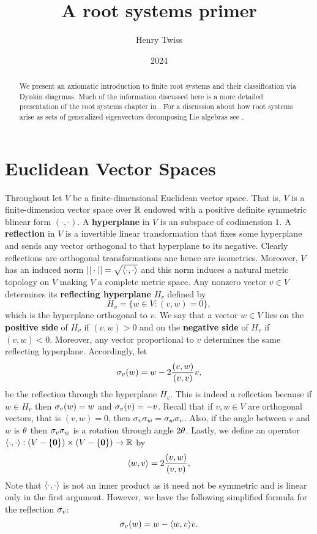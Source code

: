 \documentclass[12pt,reqno,oneside]{amsart}
\title{A root systems primer}
\author{Henry Twiss}
\date{2024}
\begin{document}
\begin{abstract}
    We present an axiomatic introduction to finite root systems and their classification via Dynkin diagrmas. Much of the information discussed here is a more detailed presentation of the root systems chapter in \cite{humphreys1972introduction}. For a discussion about how root systems arise as sets of generalized eigenvectors decomposing Lie algebras see \cite{humphreys1972introduction}.
\end{abstract}

\maketitle

\section{Euclidean Vector Spaces}
    Throughout let $V$ be a finite-dimensional Euclidean vector space. That is, $V$ is a finite-dimension vector space over $\mathbb{R}$ endowed with a positive definite symmetric blinear form $(\cdot,\cdot)$. A \textbf{hyperplane} in $V$ is an subspace of codimension $1$. A \textbf{reflection} in $V$ is a invertible linear transformation that fixes some hyperplane and sends any vector orthogonal to that hyperplane to its negative. Clearly reflections are orthogonal transformations ane hence are isometries. Moreover, $V$ has an induced norm $||\cdot|| = \sqrt{\langle\cdot,\cdot\rangle}$ and this norm induces a natural metric topology on $V$ making $V$ a complete metric space. Any nonzero vector $v \in V$ determines its \textbf{reflecting hyperplane} $H_{v}$ defined by
    \[
        H_{v} = \{w \in V:(v,w) = 0\},
    \]
    which is the hyperplane orthogonal to $v$. We say that a vector $w \in V$ lies on the \textbf{positive side} of $H_{v}$ if $(v,w) > 0$ and on the \textbf{negative side} of $H_{v}$ if $(v,w) < 0$. Moreover, any vector proportional to $v$ determines the same reflecting hyperplane. Accordingly, let
    \[
        \sigma_{v}(w) = w-2\frac{(v,w)}{(v,v)}v, 
    \]
    be the reflection through the hyperplane $H_{v}$. This is indeed a reflection because if $w \in H_{v}$ then $\sigma_{v}(w) = w$ and $\sigma_{v}(v) = -v$. Recall that if $v,w \in V$ are orthogonal vectors, that is $(v,w) = 0$, then $\sigma_{v}\sigma_{w} = \sigma_{w}\sigma_{v}$. Also, if the angle between $v$ and $w$ is $\theta$ then $\sigma_{v}\sigma_{w}$ is a rotation through angle $2\theta$. Lastly, we define an operator $\langle\cdot,\cdot\rangle:(V-\{\mathbf{0}\}) \times (V-\{\mathbf{0}\}) \to \mathbb{R}$ by
    \[
        \langle w,v\rangle = 2\frac{(v,w)}{(v,v)},
    \]
    Note that $\langle\cdot,\cdot\rangle$ is not an inner product as it need not be symmetric and is linear only in the first argument. However, we have the following simplified formula for the reflection $\sigma_{v}$:
    \[
        \sigma_{v}(w) = w-\langle w,v\rangle v.
    \]
\end{document}
